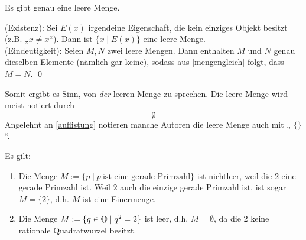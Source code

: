 \begin{satz} \label{leeremengeeind}
    Es gibt genau eine leere Menge.
\end{satz}


\begin{bew}
    (Existenz): Sei $E(x)$ irgendeine Eigenschaft, die kein einziges Objekt besitzt (z.B. „$x\neq x$“). Dann ist $\{ x\mid E(x) \}$ eine leere Menge. \\[0.5em]
    (Eindeutigkeit): Seien $M,N$ zwei leere Mengen. Dann enthalten $M$ und $N$ genau dieselben Elemente (nämlich gar keine), sodass aus \cref{mengengleich} folgt, dass $M=N$. \qed
\end{bew}


\begin{nota}
    Somit ergibt es Sinn, von \emph{der} leeren Menge zu sprechen. Die leere Menge wird meist notiert durch
        \[ \emptyset \]
    Angelehnt an \cref{auflistung} notieren manche Autoren die leere Menge auch mit „ $\{\}$ “.
\end{nota}


\begin{bsp}
    Es gilt:
    \begin{enumerate}
        \item Die Menge $M:=\{p\mid p\ \text{ist eine gerade Primzahl}\}$ ist nichtleer, weil die $2$ eine gerade Primzahl ist. Weil $2$ auch die einzige gerade Primzahl ist, ist sogar $M=\{2\}$, d.h. $M$ ist eine Einermenge.
        \item Die Menge $M:= \{ q\in \mathbb Q\mid q^2=2\}$ ist leer, d.h. $M=\emptyset$, da die $2$ keine rationale Quadratwurzel besitzt.
    \end{enumerate}
\end{bsp}


